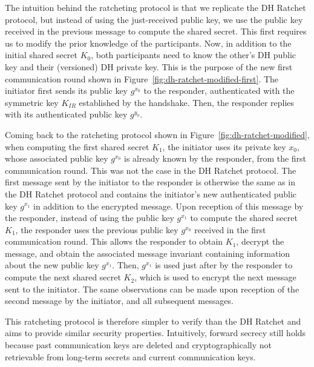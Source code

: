 The intuition behind the ratcheting protocol is that we replicate the DH Ratchet protocol, but instead of using the just-received public key, we use the public key received in the previous message to compute the shared secret.
This first requires us to modify the prior knowledge of the participants. Now, in addition to the initial shared secret $K_0$, both participants need to know the other's DH public key and their (versioned) DH private key.
This is the purpose of the new first communication round shown in Figure~\ref{fig:dh-ratchet-modified-first}. 
The initiator first sends its public key $g^{x_0}$ to the responder, authenticated with the symmetric key $K_{IR}$ established by the handshake. Then, the responder replies with its authenticated public key $g^{y_0}$.

Coming back to the ratcheting protocol shown in Figure~\ref{fig:dh-ratchet-modified}, when computing the first shared secret $K_1$, the initiator uses its private key $x_0$, whose associated public key $g^{x_0}$ is already known by the responder, from the first communication round.
This was not the case in the DH Ratchet protocol.
The first message sent by the initiator to the responder is otherwise the same as in the DH Ratchet protocol and contains the initiator's new authenticated public key $g^{x_1}$ in addition to the encrypted message.
Upon reception of this message by the responder, instead of using the public key $g^{x_1}$ to compute the shared secret $K_1$, the responder uses the previous public key $g^{x_0}$ received in the first communication round.
This allows the responder to obtain $K_1$, decrypt the message, and obtain the associated message invariant containing information about the new public key $g^{x_1}$.
Then, $g^{x_1}$ is used just after by the responder to compute the next shared secret $K_2$, which is used to encrypt the next message sent to the initiator.
The same observations can be made upon reception of the second message by the initiator, and all subsequent messages. 

This ratcheting protocol is therefore simpler to verify than the DH Ratchet and aims to provide similar security properties.
Intuitively, forward secrecy still holds because past communication keys are deleted and cryptographically not retrievable from long-term secrets and current communication keys.


